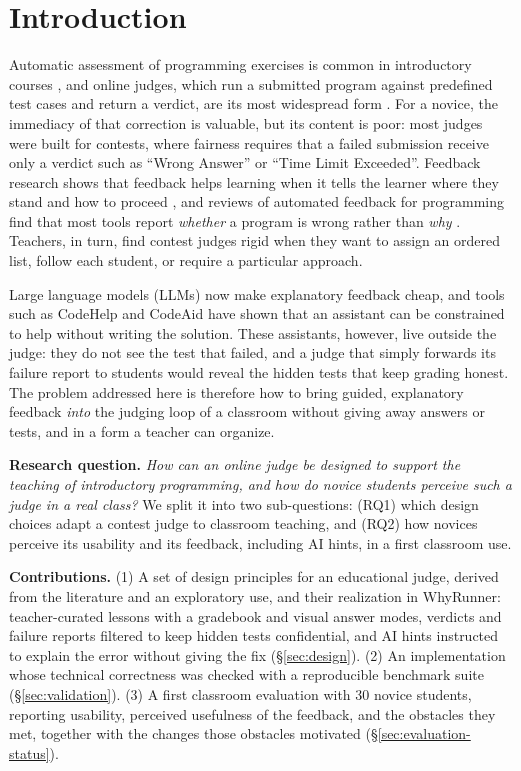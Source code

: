 \documentclass[12pt]{article}
\begin{document}
\section{Introduction}

Automatic assessment of programming exercises is common in introductory courses \cite{alamutka2005survey,ihantola2010review}, and online judges, which run a submitted program against predefined test cases and return a verdict, are its most widespread form \cite{wasik2018survey}. For a novice, the immediacy of that correction is valuable, but its content is poor: most judges were built for contests, where fairness requires that a failed submission receive only a verdict such as ``Wrong Answer'' or ``Time Limit Exceeded''. Feedback research shows that feedback helps learning when it tells the learner where they stand and how to proceed \cite{hattie2007power}, and reviews of automated feedback for programming find that most tools report \emph{whether} a program is wrong rather than \emph{why} \cite{keuning2018systematic}. Teachers, in turn, find contest judges rigid when they want to assign an ordered list, follow each student, or require a particular approach.

Large language models (LLMs) now make explanatory feedback cheap, and tools such as CodeHelp \cite{liffiton2023codehelp} and CodeAid \cite{kazemitabaar2024codeaid} have shown that an assistant can be constrained to help without writing the solution. These assistants, however, live outside the judge: they do not see the test that failed, and a judge that simply forwards its failure report to students would reveal the hidden tests that keep grading honest. The problem addressed here is therefore how to bring guided, explanatory feedback \emph{into} the judging loop of a classroom without giving away answers or tests, and in a form a teacher can organize.

\textbf{Research question.} \emph{How can an online judge be designed to support the teaching of introductory programming, and how do novice students perceive such a judge in a real class?} We split it into two sub-questions: (RQ1) which design choices adapt a contest judge to classroom teaching, and (RQ2) how novices perceive its usability and its feedback, including AI hints, in a first classroom use.

\textbf{Contributions.} (1) A set of design principles for an educational judge, derived from the literature and an exploratory use, and their realization in WhyRunner: teacher-curated lessons with a gradebook and visual answer modes, verdicts and failure reports filtered to keep hidden tests confidential, and AI hints instructed to explain the error without giving the fix (\S\ref{sec:design}). (2) An implementation whose technical correctness was checked with a reproducible benchmark suite (\S\ref{sec:validation}). (3) A first classroom evaluation with 30 novice students, reporting usability, perceived usefulness of the feedback, and the obstacles they met, together with the changes those obstacles motivated (\S\ref{sec:evaluation-status}).
\end{document}
